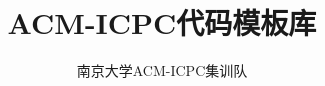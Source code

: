 \documentclass[9pt]{article}
\begin{document}
\title{\Huge \hei \bf ACM-ICPC代码模板库}
\author{南京大学ACM-ICPC集训队}
\date{}

\maketitle

\begin{multicols}{2}
\tableofcontents
\end{multicols}

\newpage

\columnseprule=0.25pt

\begin{multicols}{2}

\end{multicols}
\end{document}
